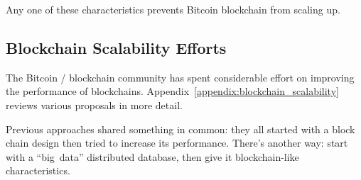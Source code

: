 Any one of these characteristics prevents Bitcoin blockchain from scaling up.

\subsection{Blockchain Scalability Efforts}
The Bitcoin / blockchain community has spent considerable effort on improving the performance of blockchains.
Appendix~\ref{appendix:blockchain_scalability} reviews various proposals in more detail.

Previous approaches shared something in common: they all started with a block chain design then tried to increase its performance.
There’s another way: start with a ``big~data'' distributed database, then give it blockchain-like characteristics.
